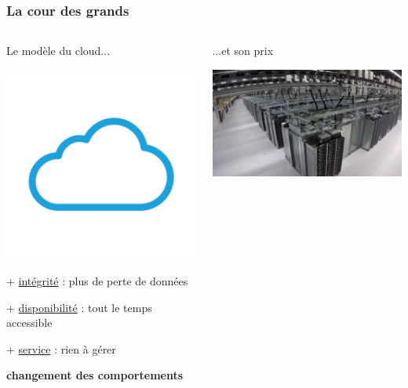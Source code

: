 \documentclass[aspectratio=169]{beamer}
\begin{document}
\begin{frame}[t]
	\frametitle{La cour des grands}

\begin{columns}[t]
\begin{column}{0.5\textwidth}
	{\huge Le modèle du cloud...}
 
\begin{center}
	\includegraphics[scale=0.08]{img/cloud.png}
\end{center}

	+ \underline{intégrité} : plus de perte de données

	+ \underline{disponibilité} : tout le temps accessible
	
	+ \underline{service} : rien à gérer

	\vspace{0.15cm}
	\textbf{changement des comportements}
\end{column}
\pause
\begin{column}{0.5\textwidth}
	{\huge ...et son prix}
 
\begin{center}
	\includegraphics[scale=0.07]{img/dc.jpg}
\end{center}


\end{column}
\end{columns}
\end{frame}
\end{document}
